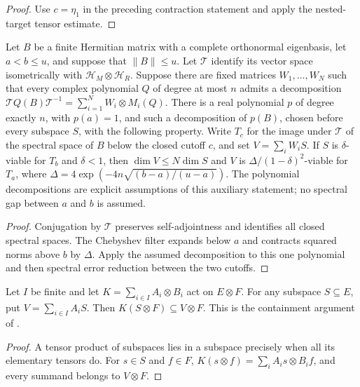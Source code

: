 \begin{proof}
    \leanok
    Use $c=\eta_1$ in the preceding contraction statement and apply the
    nested-target tensor estimate.
\end{proof}

\begin{theorem}
    \label{thm:chebyshev_nested_polynomial_family}
    \leanok
    Let $B$ be a finite Hermitian matrix with a complete orthonormal
    eigenbasis, let $a<b\le u$, and suppose that $\|B\|\le u$.
    Let $\mathcal T$ identify its vector space isometrically with
    $\mathcal H_M\otimes\mathcal H_R$. Suppose there are fixed matrices
    $W_1,\ldots,W_N$ such that every complex polynomial $Q$ of degree
    at most $n$ admits a decomposition
    $\mathcal TQ(B)\mathcal T^{-1}=\sum_{i=1}^N W_i\otimes M_i(Q)$.
    There is a real polynomial $p$ of degree exactly $n$, with $p(a)=1$,
    and such a decomposition of $p(B)$, chosen before every subspace $S$,
    with the following property. Write $T_c$ for the image under
    $\mathcal T$ of the spectral space of $B$ below the closed cutoff $c$,
    and set $V=\sum_i W_iS$. If $S$ is $\delta$-viable for $T_b$ and
    $\delta<1$, then $\dim V\le N\dim S$ and $V$ is
    $\Delta/(1-\delta)^2$-viable for $T_a$, where
    $\Delta=4\exp(-4n\sqrt{(b-a)/(u-a)})$.
    The polynomial decompositions are explicit assumptions of this
    auxiliary statement; no spectral gap between $a$ and $b$ is assumed.
\end{theorem}
\begin{proof}\leanok
    Conjugation by $\mathcal T$ preserves self-adjointness and identifies
    all closed spectral spaces. The Chebyshev filter expands below $a$
    and contracts squared norms above $b$ by $\Delta$.
    Apply the assumed decomposition to this one polynomial and then
    spectral error reduction between the two cutoffs.
\end{proof}

\begin{lemma}
    \label{lem:tensor_family_image_containment}
    \leanok
    Let $I$ be finite and let $K=\sum_{i\in I}A_i\otimes B_i$ act on
    $E\otimes F$. For any subspace $S\subseteq E$, put
    $V=\sum_{i\in I}A_iS$. Then
    $K(S\otimes F)\subseteq V\otimes F$.
    This is the containment argument of
    \cite[Lemma~l:er, lines 606--622]{Arad2016RigorousRG}.
\end{lemma}
\begin{proof}\leanok
    A tensor product of subspaces lies in a subspace precisely when all
    its elementary tensors do. For $s\in S$ and $f\in F$,
    $K(s\otimes f)=\sum_i A_is\otimes B_if$, and every summand belongs
    to $V\otimes F$.
\end{proof}

